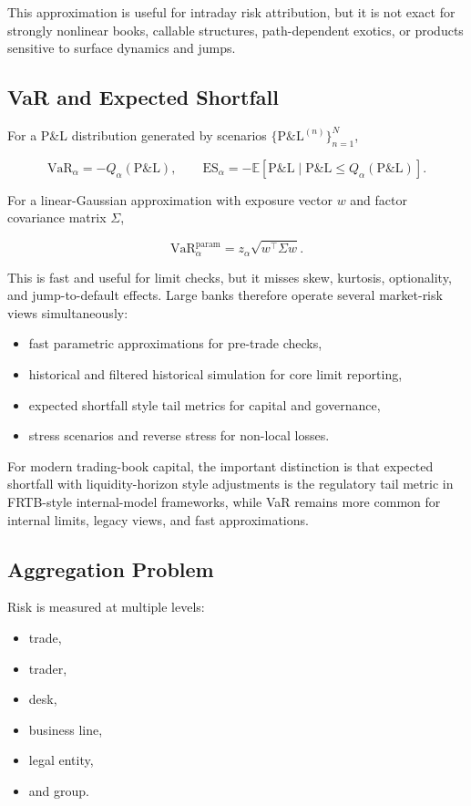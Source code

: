 \documentclass{apex_mdd}
\begin{document}
This approximation is useful for intraday risk attribution, but it is not exact for strongly nonlinear books, callable structures, path-dependent exotics, or products sensitive to surface dynamics and jumps.

\subsection{VaR and Expected Shortfall}

For a P\&L distribution generated by scenarios $\{\mathrm{P\&L}^{(n)}\}_{n=1}^{N}$,
\begin{formulabox}
\[
  \mathrm{VaR}_{\alpha}
  =
  -Q_{\alpha}(\mathrm{P\&L}),
  \qquad
  \mathrm{ES}_{\alpha}
  =
  -\mathbb{E}[\mathrm{P\&L}\mid \mathrm{P\&L}\leq Q_{\alpha}(\mathrm{P\&L})].
\]
\end{formulabox}

For a linear-Gaussian approximation with exposure vector $w$ and factor covariance matrix $\Sigma$,
\begin{formulabox}
\[
  \mathrm{VaR}_{\alpha}^{\mathrm{param}}
  =
  z_{\alpha}\sqrt{w^\top \Sigma w}.
\]
\end{formulabox}

This is fast and useful for limit checks, but it misses skew, kurtosis, optionality, and jump-to-default effects. Large banks therefore operate several market-risk views simultaneously:
\begin{itemize}
  \item fast parametric approximations for pre-trade checks,
  \item historical and filtered historical simulation for core limit reporting,
  \item expected shortfall style tail metrics for capital and governance,
  \item stress scenarios and reverse stress for non-local losses.
\end{itemize}

For modern trading-book capital, the important distinction is that expected shortfall with liquidity-horizon style adjustments is the regulatory tail metric in FRTB-style internal-model frameworks, while VaR remains more common for internal limits, legacy views, and fast approximations.

\subsection{Aggregation Problem}

Risk is measured at multiple levels:
\begin{itemize}
  \item trade,
  \item trader,
  \item desk,
  \item business line,
  \item legal entity,
  \item and group.
\end{itemize}
\end{document}
